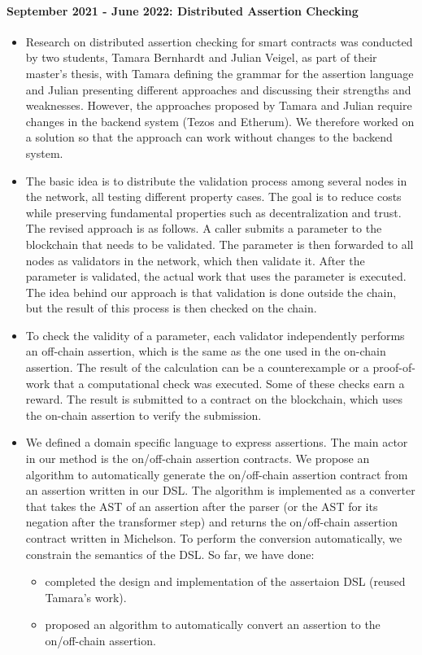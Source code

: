 \documentclass[a4paper,11pt]{article}
\begin{document}
\paragraph{September 2021 - June 2022: Distributed  Assertion Checking}
\begin{itemize}
\item Research on distributed assertion checking for smart contracts was conducted by two students, Tamara Bernhardt and Julian Veigel, as part of their master's thesis, with Tamara defining the grammar for the assertion language and Julian presenting different approaches and discussing their strengths and weaknesses. However, the approaches proposed by Tamara and Julian require changes  in the backend system (Tezos and Etherum). We therefore worked on a solution so that the approach can work without changes to the backend system.
\item 
The basic idea is to distribute the validation process among several nodes in the network, all testing different property cases. The goal is to reduce costs while preserving fundamental properties such as decentralization and trust. The revised approach is as follows. A caller submits a parameter to the blockchain that needs to be validated. The parameter is then forwarded to all nodes as validators in the network, which then validate it. After the parameter is validated, the actual work that uses the parameter is executed. The idea behind our approach is that validation is done outside the chain, but the result of this process is then checked on the chain. 
\item To check the validity of a parameter, each validator independently performs an off-chain assertion, which is the same as the one used in the on-chain assertion. The result of the calculation can be a counterexample or a proof-of-work that a  computational check was executed. Some of these checks earn a reward. The result is submitted to a contract on the blockchain, which uses the on-chain assertion to verify the submission.
\item We defined a domain specific language to express assertions. The main actor in our method is the on/off-chain assertion contracts. We propose an algorithm to automatically generate the on/off-chain assertion contract from an assertion written in our DSL. The algorithm is implemented as a converter that takes the AST of an assertion after the parser (or the AST for its negation after the transformer step) and returns the on/off-chain assertion contract written in Michelson. To perform the conversion automatically, we constrain the semantics of the DSL. So far, we have done:
\begin{itemize}
\item completed the design and implementation of the assertaion DSL (reused Tamara's work).
\item proposed an algorithm to automatically convert an assertion to the on/off-chain assertion.
\end{itemize}
\end{itemize}  
\end{document}
